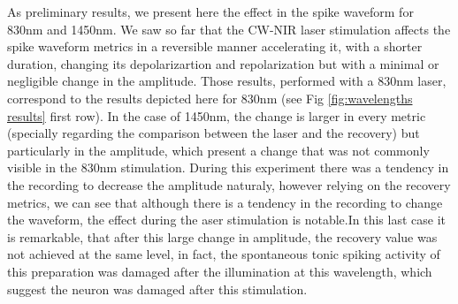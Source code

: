 As preliminary results, we present here the effect in the spike waveform for 830nm and 1450nm. We saw so far that the CW-NIR laser stimulation affects the spike waveform metrics in a reversible manner accelerating it, with a shorter duration, changing its depolarizartion and repolarization but with a minimal or negligible change in the amplitude. Those results, performed with a 830nm laser, correspond to the results depicted here for 830nm (see Fig \ref{fig:wavelengths results} first row). In the case of 1450nm, the change is larger in every metric (specially regarding the comparison between the laser and the recovery) but particularly in the amplitude, which present a change that was not commonly visible in the 830nm stimulation. During this experiment there was a tendency in the recording to decrease the amplitude naturaly, however relying on the recovery metrics, we can see that although there is a tendency in the recording to change the waveform, the effect during the aser stimulation is notable.In this last case it is remarkable, that after this large change in amplitude, the recovery value was not achieved at the same level, in fact, the spontaneous tonic spiking activity of this preparation was damaged after the illumination at this wavelength, which suggest the neuron was damaged after this stimulation. 


